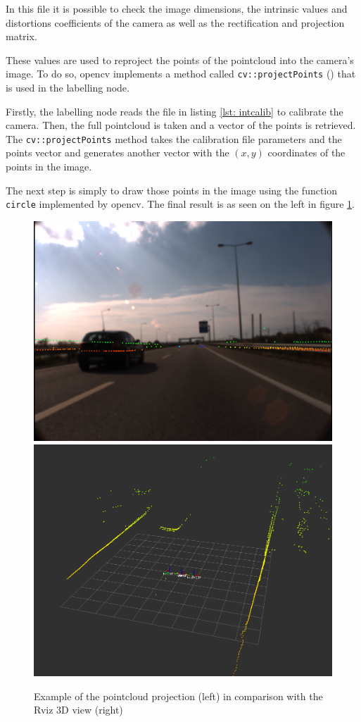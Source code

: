 In this file it is possible to check the image dimensions, the intrinsic values and distortions coefficients of the camera as well as the rectification and projection matrix.

These values are used to reproject the points of the pointcloud into the camera's image. To do so, \gls{opencv} implements a method called \texttt{cv::projectPoints} (\cite{OpenCVa}) that is used in the labelling node. 

Firstly, the labelling node reads the file in listing \ref{lst: intcalib} to calibrate the camera. Then, the full pointcloud is taken and a vector of the points is retrieved. The \texttt{cv::projectPoints} method takes the calibration file parameters and the points vector and generates another vector with the $(x,y)$ coordinates of the points in the image.

The next step is simply to draw those points in the image using the function \texttt{circle} implemented by \gls{opencv}. The final result is as seen on the left in figure \ref{fig:projectpoints}.

\begin{figure}[htp]
	
	\centering
	\includegraphics[width=.47\textwidth]{caplabel/imgs/projectpc.png}
	\includegraphics[width=.45\textwidth]{caplabel/imgs/rvizpc.png}
	
	\caption{Example of the pointcloud projection (left) in comparison with the Rviz 3D view (right)}
	\label{fig:projectpoints}
	
\end{figure}


